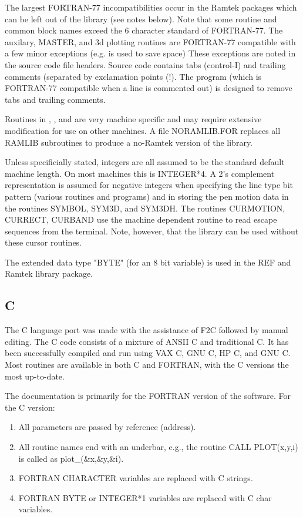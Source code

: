 \documentclass[11pt]{report}
\begin{document}
The largest FORTRAN-77 incompatibilities occur in the Ramtek packages
which can be left out of the library (see notes below).  Note that
some routine and common block names exceed the 6 character standard of
FORTRAN-77.  The auxilary, MASTER, and 3d plotting routines are
FORTRAN-77 compatible with a few minor exceptions (e.g. 
is used to save space) These exceptions are noted in the source code
file headers.  Source code contains tabs (control-I) and trailing
comments (separated by exclamation points (!).  The program 
(which is FORTRAN-77 compatible when a line is commented out) is
designed to remove tabs and trailing comments.

Routines in , , and  are very machine
specific and may require extensive modification for use on other
machines.  A file NORAMLIB.FOR replaces all RAMLIB subroutines to
produce a no-Ramtek version of the library.

Unless specificially stated, integers are all assumed to be the
standard default machine length.  On most machines this is INTEGER*4.
A 2's complement representation is assumed for negative integers when
specifying the line type bit pattern (various routines and programs)
and in storing the pen motion data in the routines SYMBOL, SYM3D, and
SYM3DH.  The  routines CURMOTION, CURRECT, CURBAND use the
machine dependent routine  to read escape sequences from
the terminal.  Note, however, that the library can be used without
these cursor routines.

The  extended  data type "BYTE" (for an 8 bit
variable) is used in the REF and Ramtek library package.

\subsection{C}

The C language port was made with the assistance of F2C followed by
manual editing.  The C code consists of a mixture of ANSII C and
traditional C.  It has been successfully compiled and run using VAX C,
GNU C, HP C, and GNU C.  Most routines are available in both C
and FORTRAN, with the C versions the most up-to-date.

The documentation is primarily for the FORTRAN version of the
software.  For the C version:

\begin{enumerate}
\item All parameters are passed by reference (address).
\item All routine names end with an underbar, e.g., the routine
CALL PLOT(x,y,i) is called as plot\_(\&x,\&y,\&i).
\item FORTRAN CHARACTER variables are replaced with C strings.
\item FORTRAN BYTE or INTEGER*1 variables are replaced with C char
variables.
\end{enumerate}
\end{document}
